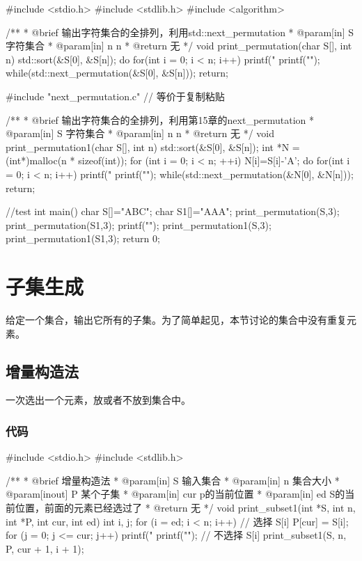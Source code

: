 \begin{Codex}[label=print_permutation_next.c]
#include <stdio.h>
#include <stdlib.h>
#include <algorithm>

/**
 * @brief 输出字符集合的全排列，利用std::next_permutation
 * @param[in] S 字符集合
 * @param[in] n n
 * @return 无
 */
void print_permutation(char S[], int n) {
    std::sort(&S[0], &S[n]);
    do {
        for(int i = 0; i < n; i++) printf("%
        printf("\n");
    }while(std::next_permutation(&S[0], &S[n]));
    return;
}

#include "next_permutation.c"  // 等价于复制粘贴

/**
 * @brief 输出字符集合的全排列，利用第15章的next_permutation
 * @param[in] S 字符集合
 * @param[in] n n
 * @return 无
 */
void print_permutation1(char S[], int n) {
    std::sort(&S[0], &S[n]);
    int *N = (int*)malloc(n * sizeof(int));
    for (int i = 0; i < n; ++i) N[i]=S[i]-'A';
    do {
        for(int i = 0; i < n; i++) printf("%
        printf("\n");
    }while(std::next_permutation(&N[0], &N[n]));
    return;
}

//test
int main() {
    char S[]="ABC";
    char S1[]="AAA";
    print_permutation(S,3);
    print_permutation(S1,3);
    printf("\n\n");
    print_permutation1(S,3);
    print_permutation1(S1,3);
    return 0;
}
\end{Codex}


\section{子集生成} %
给定一个集合，输出它所有的子集。为了简单起见，本节讨论的集合中没有重复元素。


\subsection{增量构造法}
一次选出一个元素，放或者不放到集合中。

\subsubsection{代码}

\begin{Codex}[label=subset.c]
#include <stdio.h>
#include <stdlib.h>

/**
 * @brief 增量构造法
 * @param[in] S 输入集合
 * @param[in] n 集合大小
 * @param[inout] P 某个子集
 * @param[in] cur p的当前位置
 * @param[in] ed S的当前位置，前面的元素已经选过了
 * @return 无
 */
void print_subset1(int *S, int n, int *P, int cur, int ed) {
    int i, j;
    for (i = ed; i < n; i++) {
        // 选择 S[i]
        P[cur] = S[i];
        for (j = 0; j <= cur; j++) printf("%
        printf("\n");
        // 不选择 S[i]
        print_subset1(S, n, P, cur + 1, i + 1);
    }
}
\end{Codex}



